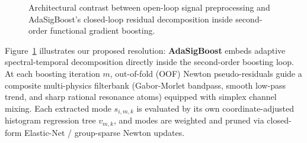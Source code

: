\documentclass[10pt]{article}
\begin{document}
\begin{figure}[t]
\caption{Architectural contrast between open-loop signal preprocessing and AdaSigBoost's closed-loop residual decomposition inside second-order functional gradient boosting.}
\label{fig:arch_contrast}
\end{figure}

Figure~\ref{fig:arch_contrast} illustrates our proposed resolution: \textbf{AdaSigBoost} embeds adaptive spectral-temporal decomposition directly inside the second-order boosting loop. At each boosting iteration $m$, out-of-fold (OOF) Newton pseudo-residuals guide a composite multi-physics filterbank (Gabor-Morlet bandpass, smooth low-pass trend, and sharp rational resonance atoms) equipped with simplex channel mixing. Each extracted mode $s_{i,m,k}$ is evaluated by its own coordinate-adjusted histogram regression tree $v_{m,k}$, and modes are weighted and pruned via closed-form Elastic-Net / group-sparse Newton updates.
\end{document}
